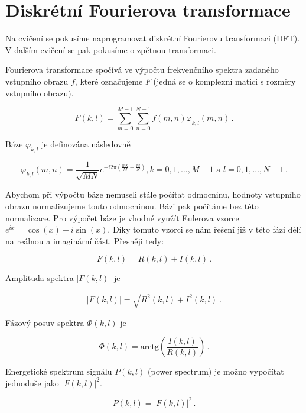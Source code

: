 \documentclass[12pt]{article}
\begin{document}
\section*{Diskrétní Fourierova transformace}

Na cvičení se pokusíme naprogramovat diskrétní Fourierovu transformaci (DFT).
V dalším cvičení se pak pokusíme o zpětnou transformaci.

Fourierova transformace spočívá ve výpočtu frekvenčního spektra zadaného vstupního obrazu $f$, které označujeme $F$ (jedná se o komplexní matici s rozměry vstupního obrazu).

\begin{equation}
    F(k, l) = \sum\limits_{m=0}^{M-1} \sum\limits_{n=0}^{N-1} f(m, n) \varphi_{k, l}(m, n)\,.
\end{equation}

Báze $\varphi_{k, l}$ je definována následovně

\begin{equation}
    \varphi_{k, l}(m, n) = \frac{1}{\sqrt{MN}} e^{-i 2 \pi \left( \frac{mk}{M} + \frac{nl}{N} \right) }, k = 0, 1, \dots, M-1 \,\, \mathrm{a} \,\, l = 0, 1, \dots, N-1\,.
\end{equation}

Abychom při výpočtu báze nemuseli stále počítat odmocninu, hodnoty vstupního obrazu
normalizujeme touto odmocninou. Bázi pak počítáme bez této normalizace.
Pro výpočet báze je vhodné využít Eulerova vzorce $e^{ix} = \cos( x ) + i \sin( x )$.
Díky tomuto vzorci se nám řešení již v této fázi dělí na reálnou a imaginární část. Přesněji tedy:

\begin{equation}
    F(k, l) = R(k, l) + I(k, l)\, .
\end{equation}

Amplituda spektra $|F(k, l)|$ je 

\begin{equation}
    |F(k, l)| = \sqrt{ R^2(k, l) + I^2(k, l)}\, .
\end{equation}

Fázový posuv spektra $\Phi(k, l)$ je 

\begin{equation}
    \Phi(k, l) = \mathrm{arctg}\left( \frac{I(k, l)}{R(k, l)} \right)\, .
\end{equation}

Energetické spektrum signálu $P(k, l)$ (power spectrum) je možno vypočítat jednoduše jako $|F(k, l)|^2$.

\begin{equation}
    P(k, l) = |F(k, l)|^2\, .
\end{equation}
\end{document}
